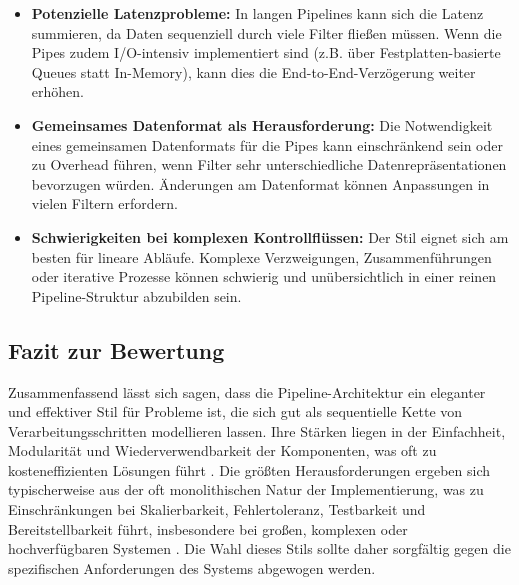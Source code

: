 \documentclass[11pt, a4paper]{article}
\begin{document}
\begin{itemize}
    \item \textbf{Potenzielle Latenzprobleme:} In langen Pipelines kann sich die Latenz summieren, da Daten sequenziell durch viele Filter fließen müssen. Wenn die Pipes zudem I/O-intensiv implementiert sind (z.B. über Festplatten-basierte Queues statt In-Memory), kann dies die End-to-End-Verzögerung weiter erhöhen.
    \item \textbf{Gemeinsames Datenformat als Herausforderung:} Die Notwendigkeit eines gemeinsamen Datenformats für die Pipes kann einschränkend sein oder zu Overhead führen, wenn Filter sehr unterschiedliche Datenrepräsentationen bevorzugen würden. Änderungen am Datenformat können Anpassungen in vielen Filtern erfordern.
    \item \textbf{Schwierigkeiten bei komplexen Kontrollflüssen:} Der Stil eignet sich am besten für lineare Abläufe. Komplexe Verzweigungen, Zusammenführungen oder iterative Prozesse können schwierig und unübersichtlich in einer reinen Pipeline-Struktur abzubilden sein.
\end{itemize}

\subsection{Fazit zur Bewertung}

Zusammenfassend lässt sich sagen, dass die Pipeline-Architektur ein eleganter und effektiver Stil für Probleme ist, die sich gut als sequentielle Kette von Verarbeitungsschritten modellieren lassen. Ihre Stärken liegen in der Einfachheit, Modularität und Wiederverwendbarkeit der Komponenten, was oft zu kosteneffizienten Lösungen führt \cite{RichardsFord2020}. Die größten Herausforderungen ergeben sich typischerweise aus der oft monolithischen Natur der Implementierung, was zu Einschränkungen bei Skalierbarkeit, Fehlertoleranz, Testbarkeit und Bereitstellbarkeit führt, insbesondere bei großen, komplexen oder hochverfügbaren Systemen \cite{RichardsFord2020}. Die Wahl dieses Stils sollte daher sorgfältig gegen die spezifischen Anforderungen des Systems abgewogen werden.

\nocite{*}


\end{document}
